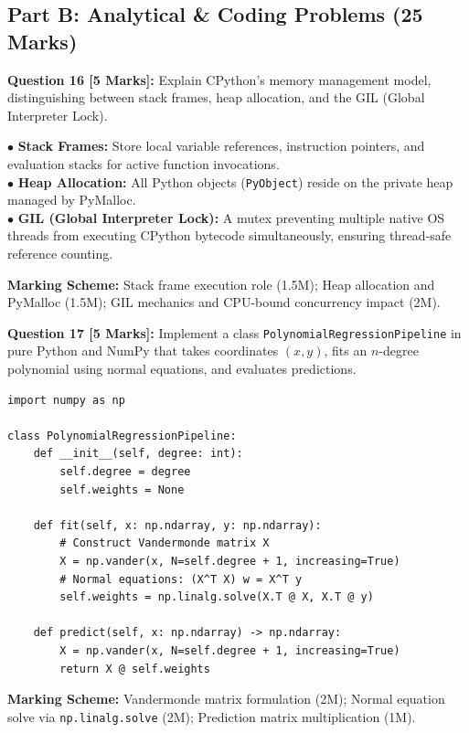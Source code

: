 \subsection*{Part B: Analytical \& Coding Problems (25 Marks)}

\noindent\textbf{Question 16 [5 Marks]:} Explain CPython's memory management model, distinguishing between stack frames, heap allocation, and the GIL (Global Interpreter Lock).
\begin{solutionbox}
$\bullet$ \textbf{Stack Frames:} Store local variable references, instruction pointers, and evaluation stacks for active function invocations.\\
$\bullet$ \textbf{Heap Allocation:} All Python objects (\texttt{PyObject}) reside on the private heap managed by PyMalloc.\\
$\bullet$ \textbf{GIL (Global Interpreter Lock):} A mutex preventing multiple native OS threads from executing CPython bytecode simultaneously, ensuring thread-safe reference counting.
\end{solutionbox}
\begin{markingrubric}
\textbf{Marking Scheme:} Stack frame execution role (1.5M); Heap allocation and PyMalloc (1.5M); GIL mechanics and CPU-bound concurrency impact (2M).
\end{markingrubric}

\noindent\textbf{Question 17 [5 Marks]:} Implement a class \texttt{PolynomialRegressionPipeline} in pure Python and NumPy that takes coordinates $(x, y)$, fits an $n$-degree polynomial using normal equations, and evaluates predictions.
\begin{solutionbox}
\begin{lstlisting}
import numpy as np

class PolynomialRegressionPipeline:
    def __init__(self, degree: int):
        self.degree = degree
        self.weights = None

    def fit(self, x: np.ndarray, y: np.ndarray):
        # Construct Vandermonde matrix X
        X = np.vander(x, N=self.degree + 1, increasing=True)
        # Normal equations: (X^T X) w = X^T y
        self.weights = np.linalg.solve(X.T @ X, X.T @ y)

    def predict(self, x: np.ndarray) -> np.ndarray:
        X = np.vander(x, N=self.degree + 1, increasing=True)
        return X @ self.weights
\end{lstlisting}
\end{solutionbox}
\begin{markingrubric}
\textbf{Marking Scheme:} Vandermonde matrix formulation (2M); Normal equation solve via \texttt{np.linalg.solve} (2M); Prediction matrix multiplication (1M).
\end{markingrubric}

